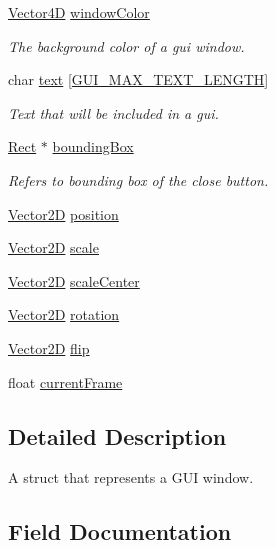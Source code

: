 \begin{DoxyCompactItemize}
\hyperlink{struct_vector4_d}{Vector4D} \hyperlink{structguiwindow__s_a51801116a41ba4f4c50852a351bb44c6}{window\+Color}
\begin{DoxyCompactList}\small\item\em The background color of a gui window. \end{DoxyCompactList}\item 
char \hyperlink{structguiwindow__s_a1c623226ca4ea91a4fad6c2127233df5}{text} \mbox{[}\hyperlink{gui_8h_a08cd19e875de54295495f95e6ff5d6bc}{G\+U\+I\+\_\+\+M\+A\+X\+\_\+\+T\+E\+X\+T\+\_\+\+L\+E\+N\+G\+TH}\mbox{]}
\begin{DoxyCompactList}\small\item\em Text that will be included in a gui. \end{DoxyCompactList}\item 
\hyperlink{shape_8h_a44e2d24ab2a21b90d03880cab9cc6d16}{Rect} $\ast$ \hyperlink{structguiwindow__s_a3d49780e142d5f067cdd71be48ad284d}{bounding\+Box}
\begin{DoxyCompactList}\small\item\em Refers to bounding box of the close button. \end{DoxyCompactList}\item 
\hyperlink{struct_vector2_d}{Vector2D} \hyperlink{structguiwindow__s_a2dc349a13930beaf26472e0d04d9563e}{position}
\item 
\hyperlink{struct_vector2_d}{Vector2D} \hyperlink{structguiwindow__s_a1b187f4d1f81894380925e9de933801a}{scale}
\item 
\hyperlink{struct_vector2_d}{Vector2D} \hyperlink{structguiwindow__s_a8ff0fe80de1fcc51fee6f1d766e9de8b}{scale\+Center}
\item 
\hyperlink{struct_vector2_d}{Vector2D} \hyperlink{structguiwindow__s_ac4e0ffa54c436c5dad6ca9481266f9ed}{rotation}
\item 
\hyperlink{struct_vector2_d}{Vector2D} \hyperlink{structguiwindow__s_afc50ca9ba71427ea7962929de4b0e1bb}{flip}
\item 
float \hyperlink{structguiwindow__s_a6c816fc91c0d3b73641b802cc889195d}{current\+Frame}
\end{DoxyCompactItemize}


\subsection{Detailed Description}
A struct that represents a G\+UI window. 

\subsection{Field Documentation}
\mbox{\label{structguiwindow__s_a3d49780e142d5f067cdd71be48ad284d}} 
